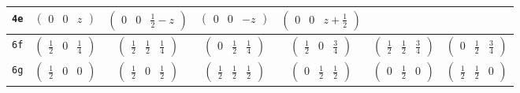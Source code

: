 \documentclass[fleqn,9pt,landscape]{jsarticle}
\begin{document}
\begin{center}
\begin{longtable}{ccccccc}
{\tt 4e} & $ \begin{pmatrix} 0 & 0 & z \end{pmatrix} $ & $ \begin{pmatrix} 0 & 0 & \frac{1}{2} - z \end{pmatrix} $ & $ \begin{pmatrix} 0 & 0 & - z \end{pmatrix} $ & $ \begin{pmatrix} 0 & 0 & z + \frac{1}{2} \end{pmatrix} $ & $  $ & $  $ \\ \hline
{\tt 6f} & $ \begin{pmatrix} \frac{1}{2} & 0 & \frac{1}{4} \end{pmatrix} $ & $ \begin{pmatrix} \frac{1}{2} & \frac{1}{2} & \frac{1}{4} \end{pmatrix} $ & $ \begin{pmatrix} 0 & \frac{1}{2} & \frac{1}{4} \end{pmatrix} $ & $ \begin{pmatrix} \frac{1}{2} & 0 & \frac{3}{4} \end{pmatrix} $ & $ \begin{pmatrix} \frac{1}{2} & \frac{1}{2} & \frac{3}{4} \end{pmatrix} $ & $ \begin{pmatrix} 0 & \frac{1}{2} & \frac{3}{4} \end{pmatrix} $ \\ \hline
{\tt 6g} & $ \begin{pmatrix} \frac{1}{2} & 0 & 0 \end{pmatrix} $ & $ \begin{pmatrix} \frac{1}{2} & 0 & \frac{1}{2} \end{pmatrix} $ & $ \begin{pmatrix} \frac{1}{2} & \frac{1}{2} & \frac{1}{2} \end{pmatrix} $ & $ \begin{pmatrix} 0 & \frac{1}{2} & \frac{1}{2} \end{pmatrix} $ & $ \begin{pmatrix} 0 & \frac{1}{2} & 0 \end{pmatrix} $ & $ \begin{pmatrix} \frac{1}{2} & \frac{1}{2} & 0 \end{pmatrix} $ \\ \hline

\end{longtable}
\end{center}
\end{document}
